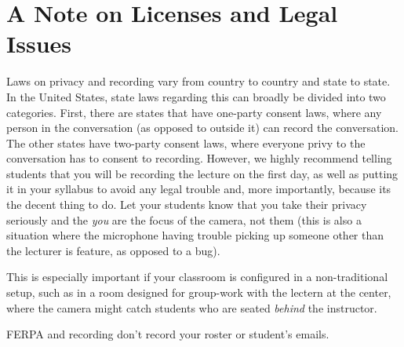 \documentclass[sigconf]{acmart}
\begin{document}
\section{A Note on Licenses and Legal Issues}
\label{legal}

Laws on privacy and recording vary from country to country and state to state.
In the United States, state laws regarding this can broadly be divided into two categories.
First, there are states that have one-party consent laws, where any person in the conversation (as opposed to outside it) can record the conversation.
The other states have two-party consent laws, where everyone privy to the conversation has to consent to recording.
However, we highly recommend telling students that you will be recording the lecture on the first day, as well as putting it in your syllabus to avoid any legal trouble and, more importantly, because its the decent thing to do.
Let your students know that you take their privacy seriously and the \textit{you} are the focus of the camera, not them (this is also a situation where the microphone having trouble picking up someone other than the lecturer is feature, as opposed to a bug).

This is especially important if your classroom is configured in a non-traditional setup, such as in a room designed for group-work with the lectern at the center, where the camera might catch students who are seated \textit{behind} the instructor.



FERPA and recording
don't record your roster or student's emails.




\end{document}
